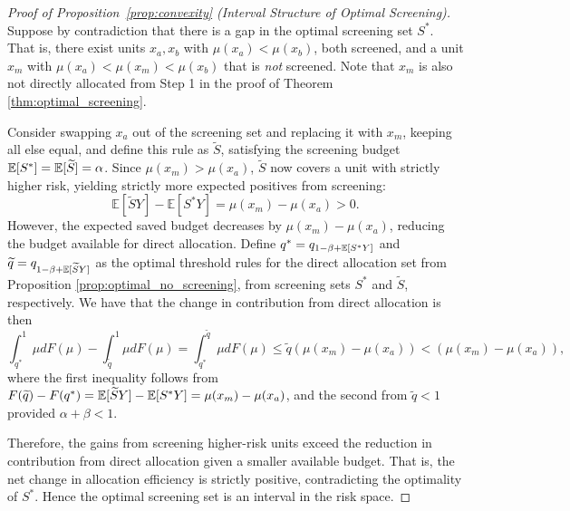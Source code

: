 \begin{proof}[Proof of Proposition~\ref{prop:convexity} (Interval Structure of Optimal Screening)]
Suppose by contradiction that there is a gap in the optimal screening set $S^*$. That is, there exist units $x_a, x_b$ with $\mu(x_a) < \mu(x_b)$, both screened, and a unit $x_m$ with $\mu(x_a) < \mu(x_m) < \mu(x_b)$ that is \emph{not} screened. Note that $x_m$ is also not directly allocated from Step 1 in the proof of Theorem \ref{thm:optimal_screening}.

Consider swapping $x_a$ out of the screening set and replacing it with $x_m$, keeping all else equal, and define this rule as $\widetilde{S}$, satisfying the screening budget $\mathbb{E}[S^*] = \mathbb{E}[\widetilde{S}] = \alpha$. Since $\mu(x_m) > \mu(x_a)$, $\widetilde{S}$ now covers a unit with strictly higher risk, yielding strictly more expected positives from screening:
$$\mathbb{E}[\widetilde{S}Y] - \mathbb{E}[S^* Y] = \mu(x_m) - \mu(x_a) > 0.$$
However, the expected saved budget decreases by $\mu(x_m) - \mu(x_a)$, reducing the budget available for direct allocation. Define $q^* = q_{1-\beta+\mathbb{E}[S^*Y]}$ and $\widetilde{q} = q_{1-\beta+\mathbb{E}[\widetilde{S}Y]}$ as the optimal threshold rules for the direct allocation set from Proposition \ref{prop:optimal_no_screening}, from screening sets $S^*$ and $\widetilde{S}$, respectively. We have that the change in contribution from direct allocation is then
$$\int_{q^*}^1\mu dF(\mu) - \int_{\widetilde{q}}^1\mu dF(\mu) = \int_{q^*}^{\widetilde{q}}\mu dF(\mu) \leq \widetilde{q}(\mu(x_m) - \mu(x_a)) < (\mu(x_m) - \mu(x_a)),$$
where the first inequality follows from $F(\widetilde{q}) - F(q^*) = \mathbb{E}[\widetilde{S}Y] - \mathbb{E}[S^*Y] = \mu(x_m) - \mu(x_a)$, and the second from $\widetilde{q} < 1$ provided $\alpha + \beta < 1$. 

Therefore, the gains from screening higher-risk units exceed the reduction in contribution from direct allocation given a smaller available budget. That is, the net change in allocation efficiency is strictly positive, contradicting the optimality of $S^*$. Hence the optimal screening set is an interval in the risk space.

\end{proof}



